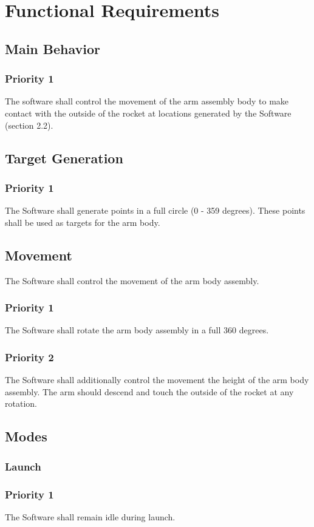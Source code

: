 \documentclass[letterpaper,10pt]{article}
\begin{document}
\section{Functional Requirements}
\subsection{Main Behavior}
\subsubsection{Priority 1}
The software shall control the movement of the arm assembly body to make contact with the outside of the rocket
at locations generated by the Software (section 2.2). 
\subsection{Target Generation}
\subsubsection{Priority 1}
The Software shall generate points in a full circle (0 - 359 degrees). These points shall be used as targets for the arm body.
\subsection{Movement}
The Software shall control the movement of the arm body assembly. 
\subsubsection{Priority 1}
The Software shall rotate the arm body assembly in a full 360 degrees.
\subsubsection{Priority 2}
The Software shall additionally control the movement the height of the arm body assembly.
The arm should descend and touch the outside of the rocket at any rotation.
\subsection{Modes}
\subsubsection{Launch}
\subsubsection{Priority 1}
The Software shall remain idle during launch.
\end{document}

